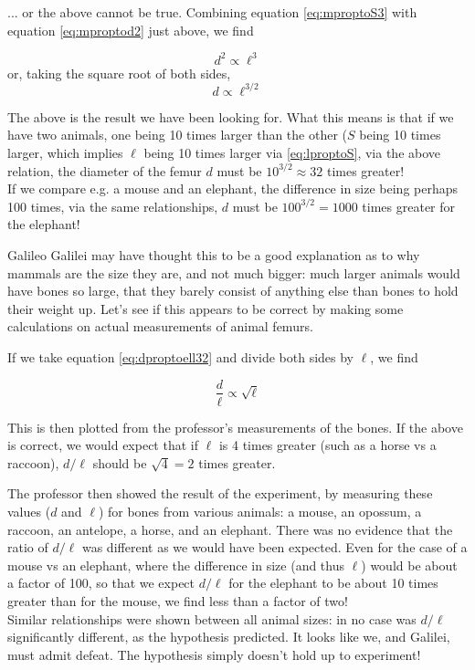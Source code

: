 ... or the above cannot be true.
Combining equation \eqref{eq:mproptoS3} with equation \eqref{eq:mproptod2} just above, we find

\begin{equation}
 d^2 \propto \ell^3
\end{equation}
or, taking the square root of both sides,
\begin{equation}
 d \propto \ell^{3/2} \label{eq:dproptoell32}
\end{equation}

The above is the result we have been looking for. What this means is that if we have two animals, one being 10 times larger than the other ($S$ being 10 times larger, which implies $\ell$ being 10 times larger via \eqref{eq:lproptoS}, via the above relation, the diameter of the femur $d$ must be $10^{3/2} \approx 32$ times greater!\\
If we compare e.g. a mouse and an elephant, the difference in size being perhaps 100 times, via the same relationships, $d$ must be $100^{3/2} = 1000$ times greater for the elephant!

Galileo Galilei may have thought this to be a good explanation as to why mammals are the size they are, and not much bigger: much larger animals would have bones so large, that they barely consist of anything else than bones to hold their weight up. Let's see if this appears to be correct by making some calculations on actual measurements of animal femurs.

If we take equation \eqref{eq:dproptoell32} and divide both sides by $\ell$, we find

\begin{equation}
\frac{d}{\ell} \propto \sqrt{\ell}
\end{equation}

This is then plotted from the professor's measurements of the bones. If the above is correct, we would expect that if $\ell$ is 4 times greater (such as a horse vs a raccoon), $d/\ell$ should be $\sqrt{4} = 2$ times greater.

The professor then showed the result of the experiment, by measuring these values ($d$ and $\ell$) for bones from various animals: a mouse, an opossum, a raccoon, an antelope, a horse, and an elephant. There was no evidence that the ratio of $d/\ell$ was different as we would have been expected. Even for the case of a mouse vs an elephant, where the difference in size (and thus $\ell$) would be about a factor of 100, so that we expect $d/\ell$ for the elephant to be about 10 times greater than for the mouse, we find less than a factor of two!\\
Similar relationships were shown between all animal sizes: in no case was $d/\ell$ significantly different, as the hypothesis predicted. It looks like we, and Galilei, must admit defeat. The hypothesis simply doesn't hold up to experiment!


